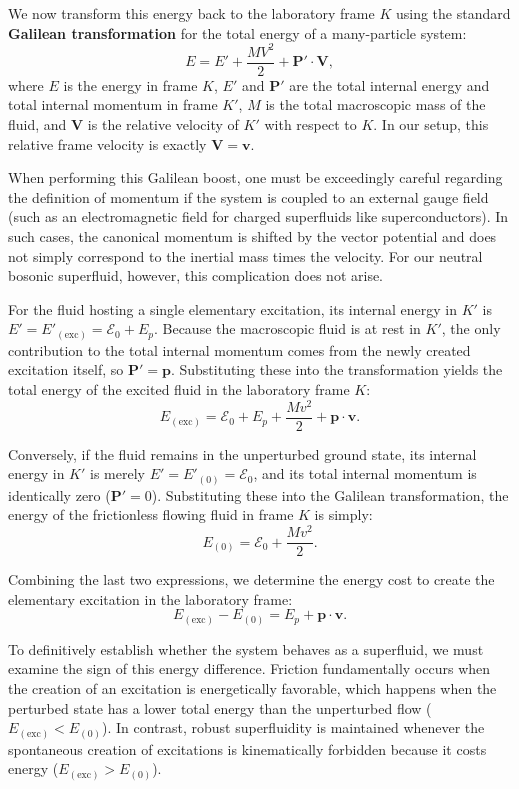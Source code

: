 We now transform this energy back to the laboratory frame \( K \) using the standard \textbf{Galilean transformation} for the total energy of a many-particle system:
\[
    E = E' + \frac{MV^2}{2} + \mathbf{P}' \cdot \mathbf{V},
\]
where \( E \) is the energy in frame \( K \), \( E' \) and \( \mathbf{P}' \) are the total internal energy and total internal momentum in frame \( K' \), \( M \) is the total macroscopic mass of the fluid, and \( \mathbf{V} \) is the relative velocity of \( K' \) with respect to \( K \). In our setup, this relative frame velocity is exactly \( \mathbf{V} = \mathbf{v} \).

\begin{remark}
    When performing this Galilean boost, one must be exceedingly careful regarding the definition of momentum if the system is coupled to an external gauge field (such as an electromagnetic field for charged superfluids like superconductors). In such cases, the canonical momentum is shifted by the vector potential and does not simply correspond to the inertial mass times the velocity. For our neutral bosonic superfluid, however, this complication does not arise.
\end{remark}

For the fluid hosting a single elementary excitation, its internal energy in \( K' \) is \( E' = E'_{(\text{exc})} = \mathcal{E}_0 + E_p \). Because the macroscopic fluid is at rest in \( K' \), the only contribution to the total internal momentum comes from the newly created excitation itself, so \( \mathbf{P}' = \mathbf{p} \). Substituting these into the transformation yields the total energy of the excited fluid in the laboratory frame \( K \):
\[
    E_{(\text{exc})} = \mathcal{E}_0 + E_p + \frac{Mv^2}{2} + \mathbf{p} \cdot \mathbf{v}.
\]

Conversely, if the fluid remains in the unperturbed ground state, its internal energy in \( K' \) is merely \( E' = E'_{(0)} = \mathcal{E}_0 \), and its total internal momentum is identically zero (\( \mathbf{P}' = 0 \)). Substituting these into the Galilean transformation, the energy of the frictionless flowing fluid in frame \( K \) is simply:
\[
    E_{(0)} = \mathcal{E}_0 + \frac{Mv^2}{2}.
\]

Combining the last two expressions, we determine the energy cost to create the elementary excitation in the laboratory frame:
\[
    E_{(\text{exc})} - E_{(0)} = E_p + \mathbf{p} \cdot \mathbf{v}.
\]

To definitively establish whether the system behaves as a superfluid, we must examine the sign of this energy difference. Friction fundamentally occurs when the creation of an excitation is energetically favorable, which happens when the perturbed state has a lower total energy than the unperturbed flow (\( E_{(\text{exc})} < E_{(0)} \)). In contrast, robust superfluidity is maintained whenever the spontaneous creation of excitations is kinematically forbidden because it costs energy (\( E_{(\text{exc})} > E_{(0)} \)).

